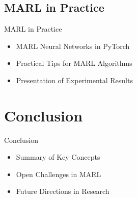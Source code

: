 \documentclass{beamer}
\begin{document}
\subsection{MARL in Practice}
\begin{frame}{MARL in Practice}
  \begin{itemize}
    \item MARL Neural Networks in PyTorch
    \item Practical Tips for MARL Algorithms
    \item Presentation of Experimental Results
  \end{itemize}
\end{frame}

\section{Conclusion}
\begin{frame}{Conclusion}
  \begin{itemize}
    \item Summary of Key Concepts
    \item Open Challenges in MARL
    \item Future Directions in Research
  \end{itemize}
\end{frame}
\end{document}
